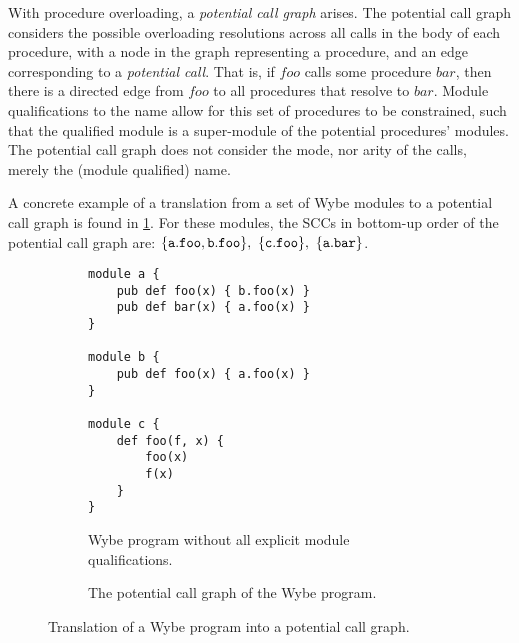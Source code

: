 With procedure overloading, a \textit{potential call graph} arises. The potential call graph considers the possible overloading resolutions across all calls in the body of each procedure, with a node in the graph representing a procedure, and an edge corresponding to a \textit{potential call}. That is, if $foo$ calls some procedure $bar$, then there is a directed edge from $foo$ to all procedures that resolve to $bar$. Module qualifications to the name allow for this set of procedures to be constrained, such that the qualified module is a super-module of the potential procedures' modules. The potential call graph does not consider the mode, nor arity of the calls, merely the (module qualified) name. 

A concrete example of a translation from a set of Wybe modules to a potential call graph is found in \cref{fig:potential-call}. For these modules, the SCCs in bottom-up order of the potential call graph are: $\mathtt{\set{a.foo, b.foo},\ \set{c.foo},\ \set{a.bar}}$.

\begin{figure}[ht]
  \centering
  \begin{subfigure}[b]{0.49\textwidth}
    \begin{lstlisting}
module a {
    pub def foo(x) { b.foo(x) }
    pub def bar(x) { a.foo(x) }
}

module b {
    pub def foo(x) { a.foo(x) }
}

module c {
    def foo(f, x) {
        foo(x)
        f(x)
    }
}
\end{lstlisting}
    \caption{Wybe program without all explicit module qualifications.}
  \end{subfigure}\hfill
  \begin{subfigure}[b]{0.49\textwidth}
    \centering
    \caption{The potential call graph of the Wybe program.}
  \end{subfigure}
  \caption{Translation of a Wybe program into a potential call graph.}
  \label{fig:potential-call}
\end{figure}


